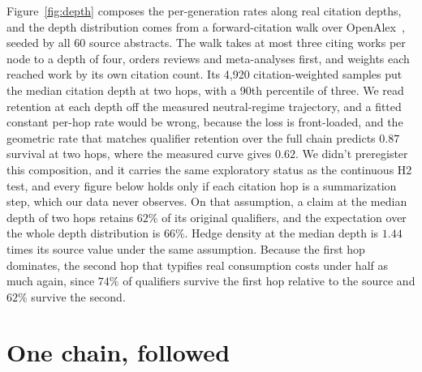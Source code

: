 \documentclass{article}
\begin{document}
Figure~\ref{fig:depth} composes the per-generation rates along real citation depths, and the depth distribution comes from a forward-citation walk over OpenAlex~\citep{priem2022openalex}, seeded by all 60 source abstracts. The walk takes at most three citing works per node to a depth of four, orders reviews and meta-analyses first, and weights each reached work by its own citation count. Its 4{,}920 citation-weighted samples put the median citation depth at two hops, with a 90th percentile of three. We read retention at each depth off the measured neutral-regime trajectory, and a fitted constant per-hop rate would be wrong, because the loss is front-loaded, and the geometric rate that matches qualifier retention over the full chain predicts $0.87$ survival at two hops, where the measured curve gives $0.62$. We didn't preregister this composition, and it carries the same exploratory status as the continuous H2 test, and every figure below holds only if each citation hop is a summarization step, which our data never observes. On that assumption, a claim at the median depth of two hops retains $62\%$ of its original qualifiers, and the expectation over the whole depth distribution is $66\%$. Hedge density at the median depth is $1.44$ times its source value under the same assumption. Because the first hop dominates, the second hop that typifies real consumption costs under half as much again, since $74\%$ of qualifiers survive the first hop relative to the source and $62\%$ survive the second.

\section{One chain, followed}
\label{app:case}
\end{document}
